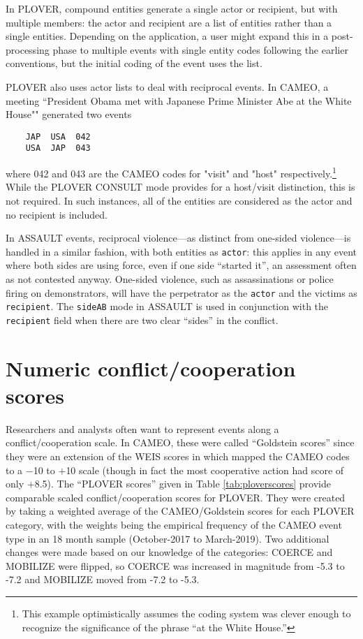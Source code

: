 \documentclass[11pt]{report}
\newcommand{\plcat}[1]{\textsf{#1}}
\newcommand{\plmod}[1]{\texttt{#1}}
\begin{document}
In PLOVER, compound entities generate a single actor or recipient, but with multiple members: the actor and recipient are a list of entities rather than a single entities. Depending on the application, a user might expand this in a post-processing phase to multiple events with single entity codes following the earlier conventions, but the initial coding of the event uses the list.

PLOVER also uses actor lists to deal with reciprocal events. In CAMEO, a meeting ``President Obama met with Japanese Prime Minister Abe at the White House"" generated two events
\begin{verbatim}
	JAP  USA  042
	USA  JAP  043
\end{verbatim}
where 042 and 043 are the CAMEO codes for "visit" and "host" respectively.\footnote{This example optimistically assumes the coding system was clever enough to recognize the significance of the phrase ``at the White House.''} While the PLOVER \plcat{CONSULT} mode provides for a host/visit distinction, this is not required. In such instances, all of the entities are considered as the actor and no recipient is included.

In \plcat{ASSAULT} events, reciprocal violence---as distinct from one-sided violence---is handled in a similar fashion, with both entities as \texttt{actor}: this applies in any event where both sides are using force, even if one side ``started it'', an assessment often as not contested anyway. One-sided violence, such as assassinations or police firing on demonstrators, will have the perpetrator as the \texttt{actor} and the victims as \texttt{recipient}. The \plmod{sideAB} mode in  \plcat{ASSAULT} is used in conjunction with the \texttt{recipient} field when there are two clear ``sides'' in the conflict.




\section{Numeric conflict/cooperation scores}

Researchers and analysts often want to represent events along a conflict/cooperation scale. In CAMEO, these were called ``Goldstein scores'' since they were an extension of the WEIS scores in \cite{Goldstein92} which mapped the CAMEO codes to a $-$10 to $+$10 scale (though in fact the most cooperative action had score of only $+$8.5). The ``PLOVER scores'' given in Table \ref{tab:ploverscores} provide comparable scaled conflict/cooperation scores for PLOVER. They were created by taking a weighted average of the CAMEO/Goldstein scores for each PLOVER category, with the weights being the empirical frequency of the CAMEO event type in an 18 month sample (October-2017 to March-2019). Two additional changes were made based on our knowledge of the categories: COERCE and MOBILIZE were flipped, so COERCE was increased in magnitude from -5.3 to -7.2 and MOBILIZE moved from -7.2 to -5.3.
\end{document}
